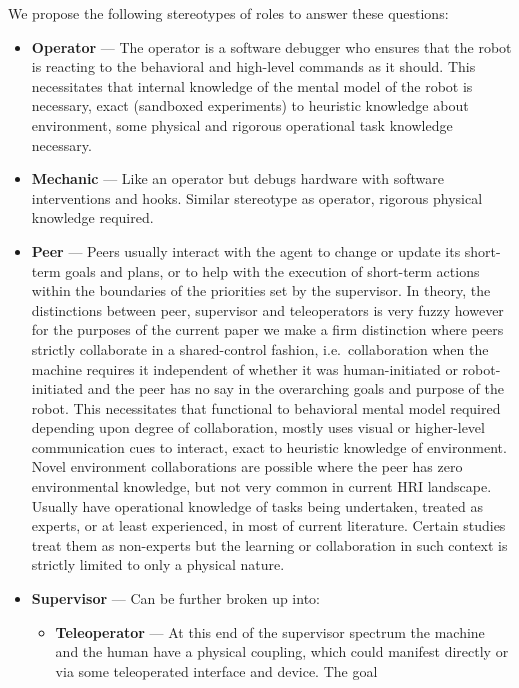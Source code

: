 \documentclass[letterpaper, 10 pt, conference]{ieeeconf} %
\theoremstyle{definition} \newtheorem{definition}{Definition}
\begin{document}
We propose the following stereotypes of roles to answer these questions:
\begin{itemize}{}
  \item \textbf{Operator} --- The operator is a software debugger who ensures
    that the robot is reacting to the behavioral and high-level commands as it
    should. This necessitates that internal knowledge of the mental model of the
    robot is necessary, exact (sandboxed experiments) to heuristic knowledge
    about environment, some physical and rigorous operational task knowledge
    necessary.
  \item \textbf{Mechanic} --- Like an operator but debugs hardware with software
    interventions and hooks. Similar stereotype as operator, rigorous physical
    knowledge required.
  \item \textbf{Peer} --- Peers usually interact with the agent to change or
    update its short-term goals and plans, or to help with the execution of
    short-term actions within the boundaries of the priorities set by the
    supervisor. In theory, the distinctions between peer, supervisor and
    teleoperators is very fuzzy however for the purposes of the current paper we
    make a firm distinction where peers strictly collaborate in a shared-control
    fashion, i.e.\ collaboration when the machine requires it independent of
    whether it was human-initiated or robot-initiated and the peer has no say in
    the overarching goals and purpose of the robot. This necessitates that
    functional to behavioral mental model required depending upon degree of
    collaboration, mostly uses visual or higher-level communication cues to
    interact, exact to heuristic knowledge of environment. Novel environment
    collaborations are possible where the peer has zero environmental knowledge,
    but not very common in current HRI landscape. Usually have operational
    knowledge of tasks being undertaken, treated as experts, or at least
    experienced, in most of current literature. Certain studies treat them as
    non-experts but the learning or collaboration in such context is strictly
    limited to only a physical nature.
  \item \textbf{Supervisor} --- Can be further broken up into:
    \begin{itemize}{}
      \item \textbf{Teleoperator} --- At this end of the supervisor spectrum the
        machine and the human have a physical coupling, which could manifest
        directly or via some teleoperated interface and device. The goal

\end{itemize}
\end{itemize}
\end{document}
